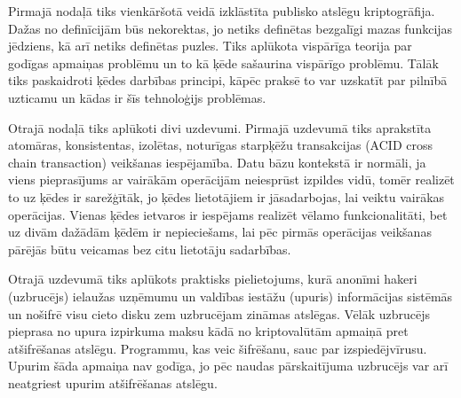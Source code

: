 Pirmajā nodaļā tiks vienkāršotā veidā izklāstīta publisko atslēgu kriptogrāfija. Dažas no definīcijām būs nekorektas, jo netiks definētas bezgalīgi mazas funkcijas jēdziens, kā arī netiks definētas puzles. Tiks aplūkota vispārīga teorija par godīgas apmaiņas problēmu un to kā ķēde sašaurina vispārīgo problēmu. Tālāk tiks paskaidroti ķēdes darbības principi, kāpēc praksē to var uzskatīt par pilnībā uzticamu un kādas ir šīs tehnoloģijs problēmas.

Otrajā nodaļā tiks aplūkoti divi uzdevumi.
Pirmajā uzdevumā tiks aprakstīta atomāras, konsistentas, izolētas, noturīgas starpķēžu transakcijas (ACID cross chain transaction) veikšanas iespējamība.\cite{back14,nolan13} Datu bāzu kontekstā ir normāli, ja viens pieprasījums ar vairākām operācijām neiesprūst izpildes vidū, tomēr realizēt to uz ķēdes ir sarežģītāk, jo ķēdes lietotājiem ir jāsadarbojas, lai veiktu vairākas operācijas. Vienas ķēdes ietvaros ir iespējams realizēt vēlamo funkcionalitāti, bet uz divām dažādām ķēdēm ir nepieciešams, lai pēc pirmās operācijas veikšanas pārējās būtu veicamas bez citu lietotāju sadarbības.

Otrajā uzdevumā tiks aplūkots praktisks pielietojums, kurā anonīmi hakeri (uzbrucējs) ielaužas uzņēmumu un valdības iestāžu (upuris) informācijas sistēmās un nošifrē visu cieto disku zem uzbrucējam zināmas atslēgas. 
Vēlāk uzbrucējs pieprasa no upura izpirkuma maksu kādā no kriptovalūtām apmaiņā pret atšifrēšanas atslēgu. Programmu, kas veic šifrēšanu, sauc par izspiedējvīrusu.
Upurim šāda apmaiņa nav godīga, jo pēc naudas pārskaitījuma uzbrucējs var arī neatgriest upurim atšifrēšanas atslēgu. %

